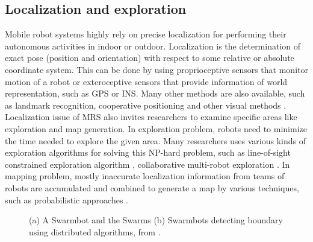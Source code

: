 \subsection*{Localization and exploration}
\label{bg:mrs:loc}
Mobile robot systems highly rely on precise localization for performing their autonomous activities in indoor or outdoor. Localization is the determination of exact pose (position and orientation) with respect to some relative or absolute coordinate system. This can be done by using proprioceptive sensors that monitor motion of a robot or exteroceptive sensors that provide information of world representation, such as  \acf{GPS} or \acf{INS}. Many other methods are also available, such as landmark recognition, cooperative positioning and other visual methods \cite{Arkin+2002}.\\
Localization issue of MRS also invites researchers to examine specific areas like exploration and map generation. In exploration problem, robots need to minimize the time needed to explore the given area. Many researchers uses various kinds of exploration algorithms for solving this NP-hard problem, such as line-of-sight constrained exploration algorithm , collaborative multi-robot exploration \cite{Burgard+2000}. In mapping problem, mostly inaccurate localization information from teams of robots are accumulated and combined to generate a map by various techniques, such as probabilistic approaches \cite{Thurn+2000}.
\begin{figure}
\centering
{} 
\hspace{0.25cm}
\caption{ (a) A Swarmbot and the Swarms 
 (b) Swarmbots detecting boundary using distributed algorithms, from \protect{}.}
\label{fig:swarmbot-boundary-detection}
\end{figure}
